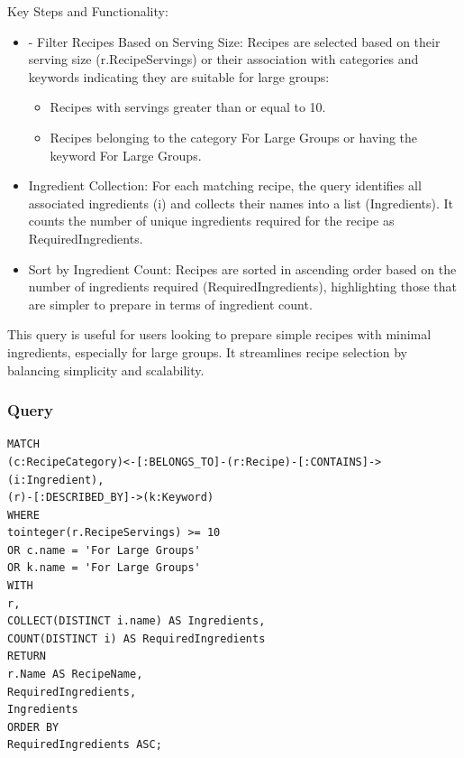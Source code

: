 \begin{enumerate}
Key Steps and Functionality:
\begin{itemize}
    \item - Filter Recipes Based on Serving Size:
    Recipes are selected based on their serving size (r.RecipeServings) or their association with categories and keywords indicating they are suitable for large groups:
    \begin{itemize}
        \item Recipes with servings greater than or equal to 10.
        \item Recipes belonging to the category For Large Groups or having the keyword For Large Groups.
    \end{itemize}
    \item Ingredient Collection: For each matching recipe, the query identifies all associated ingredients (i) and collects their names into a list (Ingredients). It counts the number of unique ingredients required for the recipe as RequiredIngredients.
    \item Sort by Ingredient Count:
Recipes are sorted in ascending order based on the number of ingredients required (RequiredIngredients), highlighting those that are simpler to prepare in terms of ingredient count.
    
\end{itemize}
This query is useful for users looking to prepare simple recipes with minimal ingredients, especially for large groups. It streamlines recipe selection by balancing simplicity and scalability.
        \subsubsection{Query}
        \begin{verbatim}
MATCH 
(c:RecipeCategory)<-[:BELONGS_TO]-(r:Recipe)-[:CONTAINS]->(i:Ingredient),
(r)-[:DESCRIBED_BY]->(k:Keyword)
WHERE 
tointeger(r.RecipeServings) >= 10 
OR c.name = 'For Large Groups' 
OR k.name = 'For Large Groups'
WITH 
r,
COLLECT(DISTINCT i.name) AS Ingredients,
COUNT(DISTINCT i) AS RequiredIngredients
RETURN 
r.Name AS RecipeName,
RequiredIngredients,
Ingredients
ORDER BY 
RequiredIngredients ASC;
        \end{verbatim}

\end{enumerate}
